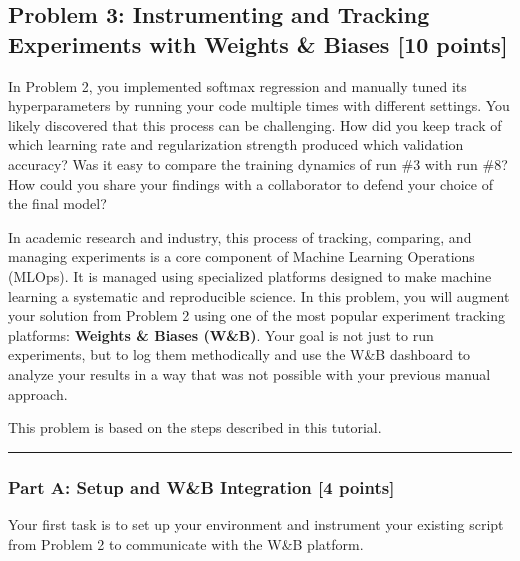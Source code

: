 \documentclass[
  letterpaper,
  DIV=11,
  numbers=noendperiod]{scrartcl}
\begin{document}
\subsection{Problem 3: Instrumenting and Tracking Experiments with
Weights \& Biases {[}10
points{]}}\label{problem-3-instrumenting-and-tracking-experiments-with-weights-biases-10-points}

In Problem 2, you implemented softmax regression and manually tuned its
hyperparameters by running your code multiple times with different
settings. You likely discovered that this process can be challenging.
How did you keep track of which learning rate and regularization
strength produced which validation accuracy? Was it easy to compare the
training dynamics of run \#3 with run \#8? How could you share your
findings with a collaborator to defend your choice of the final model?

In academic research and industry, this process of tracking, comparing,
and managing experiments is a core component of Machine Learning
Operations (MLOps). It is managed using specialized platforms designed
to make machine learning a systematic and reproducible science. In this
problem, you will augment your solution from Problem 2 using one of the
most popular experiment tracking platforms: \textbf{Weights \& Biases
(W\&B)}. Your goal is not just to run experiments, but to log them
methodically and use the W\&B dashboard to analyze your results in a way
that was not possible with your previous manual approach.

This problem is based on the steps described in this tutorial.

\begin{center}\rule{0.5\linewidth}{0.5pt}\end{center}

\subsubsection{Part A: Setup and W\&B Integration {[}4
points{]}}\label{part-a-setup-and-wb-integration-4-points}

Your first task is to set up your environment and instrument your
existing script from Problem 2 to communicate with the W\&B platform.
\end{document}
